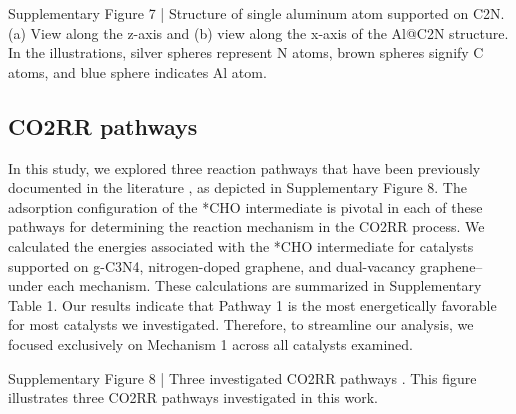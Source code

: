 Supplementary Figure 7 | Structure of single aluminum atom supported on C2N. (a) View along the z-axis and (b) view along the x-axis of the Al@C2N structure. In the illustrations, silver spheres represent N atoms, brown spheres signify C atoms, and blue sphere indicates Al atom.


\subsection{CO2RR pathways}
In this study, we explored three reaction pathways that have been previously documented in the literature \cite{durand2011structure, nie2014reaction, peterson2010copper}, as depicted in Supplementary Figure 8. The adsorption configuration of the *CHO intermediate is pivotal in each of these pathways for determining the reaction mechanism in the CO2RR process. We calculated the energies associated with the *CHO intermediate for catalysts supported on g-C3N4, nitrogen-doped graphene, and dual-vacancy graphene–under each mechanism. These calculations are summarized in Supplementary Table 1. Our results indicate that Pathway 1 is the most energetically favorable for most catalysts we investigated. Therefore, to streamline our analysis, we focused exclusively on Mechanism 1 across all catalysts examined.

Supplementary Figure 8 | Three investigated CO2RR pathways \cite{durand2011structure, nie2014reaction, peterson2010copper}. This figure illustrates three CO2RR pathways investigated in this work.

